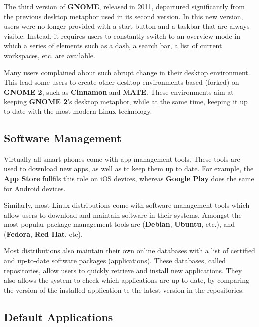 \begin{my_box}
The third version of \textbf{GNOME}, released in 2011, departured significantly from the previous desktop metaphor used in its second version. In this new version, users were no longer provided with a start button and a taskbar that are always visible. Instead, it requires users to constantly switch to an overview mode in which a series of elements such as a dash, a search bar, a list of current workspaces, etc. are available.

Many users complained about such abrupt change in their desktop environment. This lead some users to create other desktop environments based (forked) on \textbf{GNOME 2}, such as \textbf{Cinnamon} and \textbf{MATE}. These environments aim at keeping \textbf{GNOME 2}'s  desktop metaphor, while at the same time, keeping it up to date with the most modern Linux technology.
\end{my_box}

\subsection{Software Management}

Virtually all smart phones come with app management tools. These tools are used to download new apps, as well as to keep them up to date. For example, the \textbf{App Store} fullfils this role on iOS devices, whereas \textbf{Google Play} does the same for Android devices.

Similarly, most Linux distributions come with software management tools which allow users to download and maintain software in their systems. Amongst the most popular package management tools are  (\textbf{Debian}, \textbf{Ubuntu}, etc.), and  (\textbf{Fedora}, \textbf{Red Hat}, etc).

Most distributions also maintain their own online databases with a list of certified and up-to-date software packages (applications). These databases, called repositories, allow users to quickly retrieve and install new applications. They also allows the system to check which applications are up to date, by comparing the version of the installed application to the latest version in the repositories.


\subsection{Default Applications}

